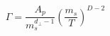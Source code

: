 \begin{equation}
\Gamma = \frac{A_p}{m_s^{d_\perp-1}}
\left (\frac{m_s}{T}\right )^{D-2}
\label{rate}
\end{equation}

